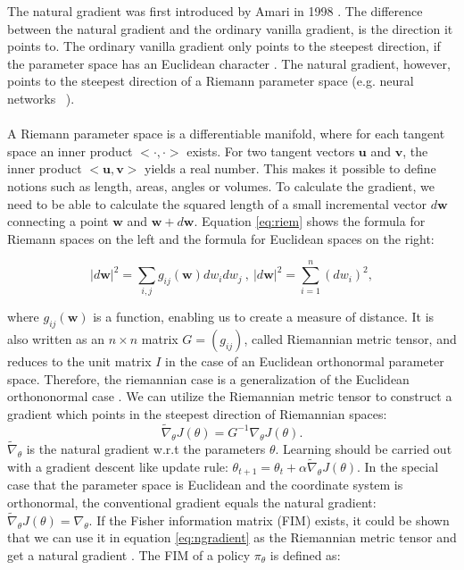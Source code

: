 The natural gradient was first introduced by Amari in 1998 \cite{amari1998natural}. The difference between the natural gradient and the ordinary vanilla gradient, is the direction it points to. The ordinary vanilla gradient only points to the steepest direction, if the parameter space has an Euclidean character \citep{amari1987differential}. The natural gradient, however, points to the steepest direction of a Riemann parameter space (e.g. neural networks  \citep{amari1998natural}).
\\\\
A Riemann parameter space is a differentiable manifold, where for each tangent space an inner product $<\cdot , \cdot >$ exists. For two tangent vectors $\mathbf{u}$ and $\mathbf{v}$, the inner product $<\mathbf{u}, \mathbf{v}>$ yields a real number. This makes it possible to define notions such as length, areas, angles or volumes. To calculate the gradient, we need to be able to calculate the squared length of a small incremental vector $d\textbf{w}$ connecting a point $\textbf{w}$ and $\textbf{w} + d\textbf{w}$. Equation \ref{eq:riem} shows the formula for Riemann spaces on the left and the formula for Euclidean spaces on the right:

\begin{equation}
	\label{eq:riem}
	|d\textbf{w}|^2 = \sum_{i,j}g_{ij}(\textbf{w}) dw_i dw_j ~,~ |d\textbf{w}|^2 = \sum_{i=1}^{n}(dw_i)^2,
\end{equation}

where $g_{ij}(\textbf{w})$ is a function, enabling us to create a measure of distance. It is also written as an $n \times n$ matrix $G = (g_{ij})$, called Riemannian metric tensor, and reduces to the unit matrix $I$ in the case of an Euclidean orthonormal parameter space. Therefore, the riemannian case is a generalization of the Euclidean orthononormal case \citep{haykin2009neural, amari1998natural}. We can utilize the Riemannian metric tensor to construct a gradient which points in the steepest direction of Riemannian spaces:
\begin{equation}
	\label{eq:ngradient}
	\widetilde{\nabla}_{\theta} J(\theta) = G^{-1} \nabla_\theta J(\theta).
\end{equation}
$\widetilde{\nabla}_{\theta}$ is the natural gradient w.r.t the parameters $\theta$.  Learning should be carried out with a gradient descent like update rule: $\theta_{t+1} = \theta_{t} + \alpha \widetilde{\nabla}_{\theta} J(\theta)$. In the special case that the parameter space is Euclidean and the coordinate system is orthonormal, the conventional gradient equals the natural gradient: $\widetilde{\nabla}_{\theta} J(\theta) = \nabla_{\theta}$.
If the Fisher information matrix (FIM) exists, it could be shown that we can use it in equation \ref{eq:ngradient} as the Riemannian metric tensor and get a natural gradient \citep{peters2008natural, amari1998efficiently}. The FIM of a policy $\pi_{\theta}$ is defined as:

